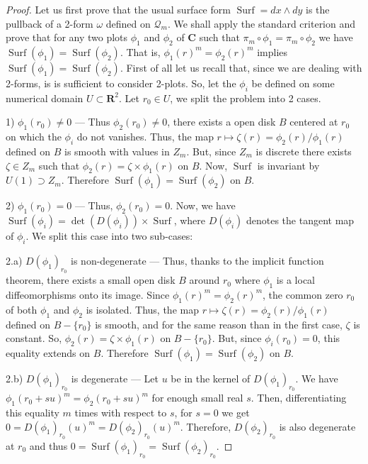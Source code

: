 \documentclass[10pt,reqno,twoside]{amsart}
\newcommand{\RR}{\mathbf{R}}
\newcommand{\CC}{\mathbf{C}}
\newcommand{\cQ}{\mathcal{Q}}
\DeclareMathOperator{\Surf}{Surf}
\newcommand{\D}{D}
\newcommand{\B}{B}
\newcommand{\Z}{Z}
\theoremstyle{plain}
\theoremstyle{definition}
\begin{document}
  \begin{proof}
    Let us first prove that the usual surface form $\Surf = dx \wedge dy$ is the pullback of a 2-form $\omega$ defined on $\cQ_m$.
    We shall apply the standard criterion and prove that for any two plots $\phi_1$ and $\phi_2$ of $\CC$ such that $\pi_m \circ \phi_1 = \pi_m \circ \phi_2$ we have $\Surf(\phi_1) = \Surf(\phi_2)$.
    That is,
    $\phi_1(r)^m = \phi_2(r)^m$ implies $\Surf(\phi_1) = \Surf(\phi_2)$.
    First of all let us recall that,
    since we are dealing with 2-forms,
    is is sufficient to consider 2-plots.
    So,
    let the $\phi_i$ be defined on some numerical domain $U \subset \RR^2$.
    Let $r_0 \in U$,
    we split the problem into 2 cases.
    
    1) $\phi_1(r_0) \neq 0$ --- Thus $\phi_2(r_0) \neq 0$,
    there exists a open disk $\B$ centered at $r_0$ on which the $\phi_i$ do not vanishes.
    Thus,
    the map $r \mapsto \zeta(r) = \phi_2(r)/\phi_1(r)$ defined on $\B$ is smooth with values in $\Z_m$.
    But,
    since $\Z_m$ is discrete there exists $\zeta \in \Z_m$ such that $\phi_2(r) = \zeta \times \phi_1(r)$ on $\B$.
    Now,
    $\Surf$ is invariant by $U(1) \supset \Z_m$.
    Therefore $\Surf(\phi_1) = \Surf(\phi_2)$ on $\B$.
    
    2) $\phi_1(r_0) = 0$ --- Thus, $\phi_2(r_0) = 0$.
    Now,
    we have $\Surf(\phi_i) = \det(\D(\phi_i)) \times \Surf$,
    where $\D(\phi_i)$ denotes the tangent map of $\phi_i$.
    We split this case into two sub-cases:
    
    2.a) $\D(\phi_1)_{r_0}$ is non-degenerate --- Thus, thanks to the implicit function theorem,
    there exists a small open disk $\B$ around $r_0$ where $\phi_1$ is a local diffeomorphisms onto its image.
    Since $\phi_1(r)^m = \phi_2(r)^m$,
    the common zero $r_0$ of both $\phi_1$ and $\phi_2$ is isolated.
    Thus,
    the map $r \mapsto \zeta(r) = \phi_2(r)/\phi_1(r)$ defined on $\B - \{r_0\}$ is smooth,
    and for the same reason than in the first case,
    $\zeta$ is constant.
    So,
    $\phi_2(r) = \zeta \times \phi_1(r)$ on $\B - \{r_0\}$.
    But,
    since $\phi_i(r_0) = 0$,
    this equality extends on $\B$.
    Therefore $\Surf(\phi_1) = \Surf(\phi_2)$ on $\B$.
    
    2.b) $\D(\phi_1)_{r_0}$ is degenerate --- Let $u$ be in the kernel of $\D(\phi_1)_{r_0}$.
    We have $\phi_1(r_0 + su)^m = \phi_2(r_0 + su)^m$ for enough small real $s$.
    Then,
    differentiating this equality $m$ times with respect to $s$,
    for $s=0$ we get $ 0 = \D(\phi_1)_{r_0}(u)^m = \D(\phi_2)_{r_0}(u)^m$.
    Therefore,
    $\D(\phi_2)_{r_0}$ is also degenerate at $r_0$ and thus $0 = \Surf(\phi_1)_{r_0} = \Surf(\phi_2)_{r_0}$.
    

\end{proof}
\end{document}
